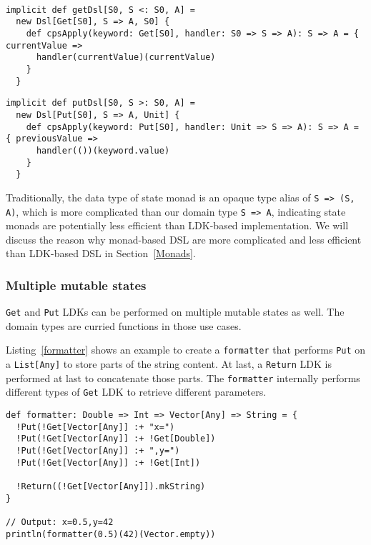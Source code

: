 \begin{lstlisting}[caption={The \lstinline{Dsl} instance for \lstinline{Get} LDK},label={getDsl}]

implicit def getDsl[S0, S <: S0, A] =
  new Dsl[Get[S0], S => A, S0] {
    def cpsApply(keyword: Get[S0], handler: S0 => S => A): S => A = { currentValue =>
      handler(currentValue)(currentValue)
    }
  }
\end{lstlisting}

\begin{lstlisting}[caption={The \lstinline{Dsl} instance for \lstinline{Put} LDK},label={putDsl}]
implicit def putDsl[S0, S >: S0, A] =
  new Dsl[Put[S0], S => A, Unit] {
    def cpsApply(keyword: Put[S0], handler: Unit => S => A): S => A = { previousValue =>
      handler(())(keyword.value)
    }
  }
\end{lstlisting}

Traditionally, the data type of state monad is an opaque type alias of \lstinline{S => (S, A)}, which is more complicated than our domain type \lstinline{S => A}, indicating state monads are potentially less efficient than LDK-based implementation. We will discuss the reason why monad-based DSL are more complicated and less efficient than LDK-based DSL in Section~\ref{Monads}.

\subsubsection{Multiple mutable states}\label{Multiple mutable states}

\lstinline{Get} and \lstinline{Put} LDKs can be performed on multiple mutable states as well. The domain types are curried functions in those use cases.

Listing~\ref{formatter} shows an example to create a \lstinline{formatter} that performs \lstinline{Put} on a \lstinline{List[Any]} to store parts of the string content. At last, a \lstinline{Return} LDK is performed at last to concatenate those parts. The \lstinline{formatter} internally performs different types of \lstinline{Get} LDK to retrieve different parameters.

\begin{lstlisting}[caption={Using \lstinline{Get} and \lstinline{Put} in a curried function},label={formatter}]
def formatter: Double => Int => Vector[Any] => String = {
  !Put(!Get[Vector[Any]] :+ "x=")
  !Put(!Get[Vector[Any]] :+ !Get[Double])
  !Put(!Get[Vector[Any]] :+ ",y=")
  !Put(!Get[Vector[Any]] :+ !Get[Int])

  !Return((!Get[Vector[Any]]).mkString)
}

// Output: x=0.5,y=42
println(formatter(0.5)(42)(Vector.empty))
\end{lstlisting}

